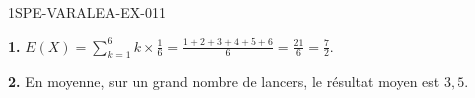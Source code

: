 \begin{corrige}{1SPE-VARALEA-EX-011}

\textbf{1.} $E(X) = \sum_{k=1}^{6} k \times \frac{1}{6} = \frac{1+2+3+4+5+6}{6} = \frac{21}{6} = \frac{7}{2}$.

\medskip
\textbf{2.} En moyenne, sur un grand nombre de lancers, le résultat moyen est $3{,}5$.

\end{corrige}
